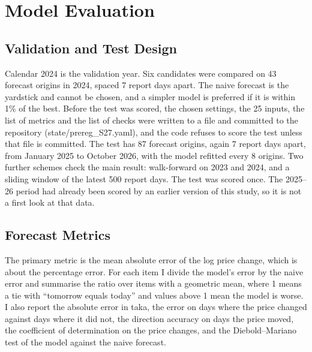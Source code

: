 \begin{table}[H]\centering\small
\caption[Chosen LightGBM setting]{Chosen LightGBM setting.}\label{tab:params}

\par{}
\end{table}

\section{Model Evaluation}

\subsection{Validation and Test Design}
Calendar 2024 is the validation year. Six candidates were compared on 43 forecast origins in 2024, spaced 7 report days apart. The naive forecast is the yardstick and cannot be chosen, and a simpler model is preferred if it is within 1\% of the best. Before the test was scored, the chosen settings, the 25 inputs, the list of metrics and the list of checks were written to a file and committed to the repository (state/prereg\_S27.yaml), and the code refuses to score the test unless that file is committed. The test has 87 forecast origins, again 7 report days apart, from January 2025 to October 2026, with the model refitted every 8 origins. Two further schemes check the main result: walk-forward on 2023 and 2024, and a sliding window of the latest 500 report days. The test was scored once. The 2025--26 period had already been scored by an earlier version of this study, so it is not a first look at that data.

\subsection{Forecast Metrics}
The primary metric is the mean absolute error of the log price change, which is about the percentage error. For each item I divide the model's error by the naive error and summarise the ratio over items with a geometric mean, where 1 means a tie with ``tomorrow equals today'' and values above 1 mean the model is worse. I also report the absolute error in taka, the error on days where the price changed against days where it did not, the direction accuracy on days the price moved, the coefficient of determination on the price changes, and the Diebold--Mariano test of the model against the naive forecast.

